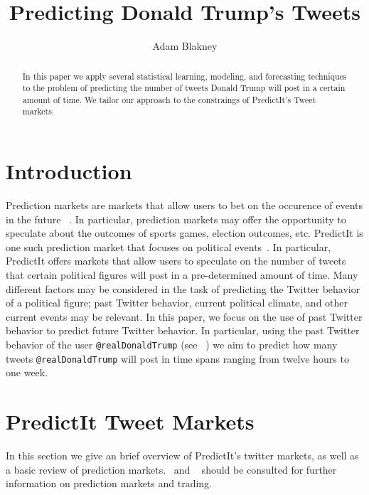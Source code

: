 \documentclass{article}
\begin{document}
\title{Predicting Donald Trump's Tweets}
\author[1]{Adam Blakney}%
\date{}%
\maketitle

\begin{abstract}
In this paper we apply several statistical learning, modeling,
and forecasting techniques to the problem of predicting the number of tweets Donald Trump will post in
a certain amount of time. We tailor our approach to the constraings of PredictIt's Tweet markets.
\end{abstract}

\section{Introduction}
Prediction markets are markets that allow users to bet on the occurence of events in the future ~\cite{def}.
In particular,
prediction markets may offer the opportunity to speculate about the outcomes of sports games, election outcomes,
etc. PredictIt is one such prediction market that focuses on political events~\cite{predictit}.
In particular, PredictIt offers markets that allow users to speculate on the number of tweets that certain
political figures will post in a pre-determined amount of time. Many different factors may be considered
in the task of predicting the Twitter behavior of a political figure; past Twitter behavior, current political
climate, and other current events may be relevant. In this paper, we focus on the use of past Twitter behavior
to predict future Twitter behavior. In particular, using the past Twitter behavior of the user
\lstinline{@realDonaldTrump} (see ~\cite{trump}) we aim to predict how many tweets
\lstinline{@realDonaldTrump} will post in time spans ranging from twelve hours to one week.

\section{PredictIt Tweet Markets}
In this section we give an brief overview of PredictIt's twitter markets, as well as a basic review of prediction markets.~\cite{def} and ~\cite{trading}
should be consulted for further information on prediction markets and trading.
\end{document}

